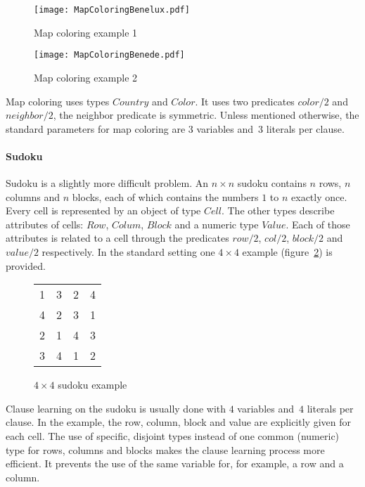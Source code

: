 \begin{figure}
\centering
\begin{minipage}{.5\textwidth}
  \centering
  \texttt{[image: MapColoringBenelux.pdf]}
  \caption{Map coloring example 1}
  \label{fig:setup_mapcolor_benelux}
\end{minipage}
\begin{minipage}{.5\textwidth}
  \centering
  \texttt{[image: MapColoringBenede.pdf]}
  \caption{Map coloring example 2}
  \label{fig:setup_mapcolor_benede}
\end{minipage}
\end{figure}

Map coloring uses types $\mathit{Country}$ and $\mathit{Color}$.
It uses two predicates $\mathit{color/2}$ and $\mathit{neighbor/2}$, the neighbor predicate is symmetric.
Unless mentioned otherwise, the standard parameters for map coloring are $3$ variables and~$3$ literals per clause.

\paragraph{Sudoku}
Sudoku is a slightly more difficult problem.
An $n \times n$ sudoku contains $n$ rows, $n$ columns and $n$ blocks, each of which contains the numbers $1$ to $n$ exactly once.
Every cell is represented by an object of type $\mathit{Cell}$.
The other types describe attributes of cells: $\mathit{Row}$, $\mathit{Colum}$, $\mathit{Block}$ and a numeric type $\mathit{Value}$.
Each of those attributes is related to a cell through the predicates $\mathit{row/2}$, $\mathit{col/2}$, $\mathit{block/2}$ and $\mathit{value/2}$ respectively.
In the standard setting one $4 \times 4$ example (figure~\ref{fig:setup_sudoku}) is provided.

\begin{figure}[!htp]
	\centering
	\begin{tabular}{|cc|cc|}
		\hline
		1 & 3 & 2 & 4 \\
		4 & 2 & 3 & 1 \\ \hline
		2 & 1 & 4 & 3 \\
		3 & 4 & 1 & 2 \\ \hline
	\end{tabular}
	\caption{$4 \times 4$ sudoku example}
	\label{fig:setup_sudoku}
\end{figure}

Clause learning on the sudoku is usually done with $4$ variables and~$4$ literals per clause.
In the example, the row, column, block and value are explicitly given for each cell.
The use of specific, disjoint types instead of one common (numeric) type for rows, columns and blocks makes the clause learning process more efficient.
It prevents the use of the same variable for, for example, a row and a column.

